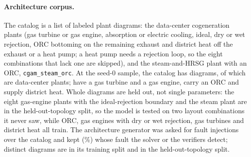 \paragraph{Architecture corpus.}
The catalog is a list of labeled plant diagrams: the data-center cogeneration plants (gas turbine or gas engine, absorption or electric cooling, ideal, dry or wet rejection, ORC bottoming on the remaining exhaust and district heat off the exhaust or a heat pump; a heat pump needs a rejection loop, so the eight combinations that lack one are skipped), and the steam-and-HRSG plant with an ORC, \texttt{cgam\_steam\_orc}.
At the seed-0 sample, the catalog has  diagrams, of which  are data-center plants;  have a gas turbine and  a gas engine,  carry an ORC and  supply district heat.
Whole diagrams are held out, not single parameters: the eight gas-engine plants with the ideal-rejection boundary and the steam plant are in the held-out-topology split, so the model is tested on two layout combinations it never saw, while ORC, gas engines with dry or wet rejection, gas turbines and district heat all train.
The architecture generator was asked for  fault injections over the catalog and kept  (\%) whose fault the solver or the verifiers detect;  distinct diagrams are in its training split and  in the held-out-topology split.


